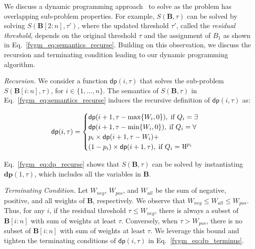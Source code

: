 We discuss a dynamic programming approach~\cite{pisinger1999linear,woeginger1992equal} to solve {\stochastic} as the problem has overlapping sub-problem properties. 
For example, $S(\mathbf{B}, \tau)$ can be solved by solving $S(\mathbf{B}[2:n], \tau')$, where the updated threshold $\tau'$, called the \textit{residual threshold}, depends on the original threshold $\tau$ and the assignment of $B_1$ as shown in Eq.~\eqref{fvgm_eq:semantics_recurse}.
Building on this observation, we discuss the recursion and terminating condition leading to our dynamic programming algorithm. 

\textit{Recursion.} We consider a function $ \mathsf{dp}(i, \tau) $ that solves the sub-problem $ S(\mathbf{B}[i:n],\tau)  $, for $ i \in \{1,\ldots,n\}  $. The semantics of  $ S(\mathbf{B},\tau) $ in Eq.~\eqref{fvgm_eq:semantics_recurse} induces the recursive definition of $ \mathsf{dp}(i,\tau) $ as: 

\begin{align}\label{fvgm_eq:dp_recurse}
 \mathsf{dp}(i,\tau)=
 \begin{cases}
 \mathsf{dp}(i+1, \tau-\max\{W_i, 0\}), \; \text{if } Q_i = \exists\\
 \mathsf{dp}(i+1, \tau-\min\{W_i, 0\}), \; \text{if } Q_i = \forall\\
 p_i \times \mathsf{dp}(i+1, \tau-W_i) + \\ (1- p_i) \times \mathsf{dp}(i+1, \tau) ,\; \text{if } Q_i = \R^{p_i}
 \end{cases}
\end{align} 

Eq.~\eqref{fvgm_eq:dp_recurse} shows that $ S(\mathbf{B},\tau) $ can be solved by instantiating $ \mathbf{dp}(1, \tau) $, which includes all the variables in $ \mathbf{B} $. 

\textit{Terminating Condition.} %
Let $ W_{neg} $, $ W_{pos} $, and $ W_{all} $ be the sum of negative, positive, and all weights of $ \mathbf{B} $, respectively. We observe that $ W_{neg} \le W_{all} \le W_{pos}$. Thus, for any $ i $, if the {residual} threshold $ \tau \le W_{neg}$, there is always a subset of $ \mathbf{B}[i:n] $ with sum of weights at least $ \tau $. Conversely, when $ \tau > W_{pos}$, there is no subset of $ \mathbf{B}[i:n] $ with sum of weights at least $ \tau $.	We leverage this bound and tighten the terminating conditions of $ \mathsf{dp}(i, \tau) $ in Eq.~\eqref{fvgm_eq:dp_terminus}. 

